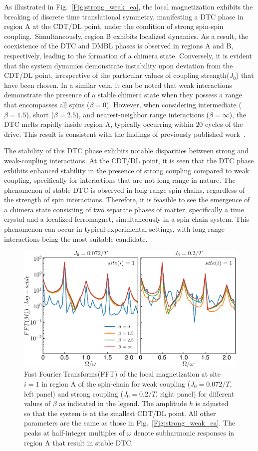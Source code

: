 \documentclass[12pt]{iopart}
\begin{document}
As illustrated in Fig.~\ref{Fig:strong_weak_ea}, the local magnetization exhibits the breaking of discrete time translational symmetry, manifesting a DTC phase in region A at the CDT/DL point, under the condition of strong spin-spin coupling. Simultaneously, region B exhibits localized dynamics. As a result, the coexistence of the DTC and DMBL phases is observed in regions A and B, respectively, leading to the formation of a chimera state. Conversely, it is evident that the system dynamics demonstrate instability upon deviation from the CDT/DL point, irrespective of the particular values of coupling strength($J_0$) that have been chosen. In a similar vein, it can be noted that weak interactions demonstrate the presence of a stable chimera state when they possess a range that encompasses all spins ($\beta=0$). However, when considering intermediate ($\beta = 1.5$), short ($\beta = 2.5$), and nearest-neighbor range interactions ($\beta = \infty$), the DTC melts rapidly inside region A, typically occurring within $20$ cycles of the drive. This result is consistent with the findings of previously published work~\cite{sakurai_phys_nodate}.
	
The stability of this DTC phase exhibits notable disparities between strong and weak-coupling interactions. At the CDT/DL point, it is seen that the DTC phase exhibits enhanced stability in the presence of strong coupling compared to weak coupling, specifically for interactions that are not long-range in nature. The phenomenon of stable DTC is observed in long-range spin chains, regardless of the strength of spin interactions. Therefore, it is feasible to see the emergence of a chimera state consisting of two separate phases of matter, specifically a time crystal and a localized ferromagnet, simultaneously in a spin-chain system. This phenomenon can occur in typical experimental settings, with long-range interactions being the most suitable candidate.
\begin{figure}[t!]
\centering
\includegraphics[width=10.cm]{single_sz_fft.pdf}
\caption{Fast Fourier Transforms(FFT) of the local magnetization at site $i=1$ in region A of the spin-chain for weak coupling ($J_0 = 0.072/T$, left panel) and strong coupling ($J_0 = 0.2/T$, right panel) for different values of $\beta$ as indicated in the legend. The amplitude $h$ is adjusted so that the system is at the smallest CDT/DL point. All other parameters are the same as those in Fig.~\ref{Fig:strong_weak_ea}. The peaks at half-integer multiples of $\omega$ denote subharmonic responses in region A that result in stable DTC.}
\label{Fig:sz_single}
\end{figure}
	
\end{document}

